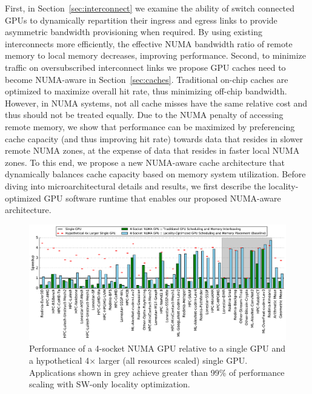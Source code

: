 First, in Section~\ref{sec:interconnect} we examine the 
ability of switch connected GPUs to dynamically repartition their ingress and 
egress links to provide asymmetric bandwidth provisioning when required.  By 
using existing interconnects more efficiently, the effective NUMA bandwidth ratio 
of remote memory to local memory decreases, improving performance. Second, 
to minimize traffic on oversubscribed interconnect links we propose GPU caches need 
to become NUMA-aware in Section~\ref{sec:caches}. Traditional on-chip caches are 
optimized to maximize 
overall hit rate, thus minimizing off-chip bandwidth. However, in NUMA 
systems, not all cache misses have the same relative cost and thus should not 
be treated equally. Due to the NUMA penalty of accessing remote memory, we show 
that performance can be maximized by preferencing cache capacity (and thus 
improving hit rate) towards data that resides in slower remote NUMA zones, at the 
expense of data that resides in faster local NUMA zones. To this end, we propose 
a new NUMA-aware cache architecture that dynamically balances cache capacity based on 
memory system utilization. Before diving into microarchitectural details and results,
we first describe the locality-optimized GPU software runtime that enables our proposed
NUMA-aware architecture.

\begin{figure}[tp] 
    \centering
    \includegraphics[width=1.0\linewidth]{figures/plot_different_baselines.pdf}
    \caption{Performance of a 4-socket NUMA GPU relative to a single GPU 
and a hypothetical 4$\times$ larger (all resources scaled) single GPU.
Applications shown in grey 
achieve greater than 99\% of performance scaling with SW-only locality optimization.}
    \label{fig:motivation}
\vspace{-.2in}
\end{figure}
